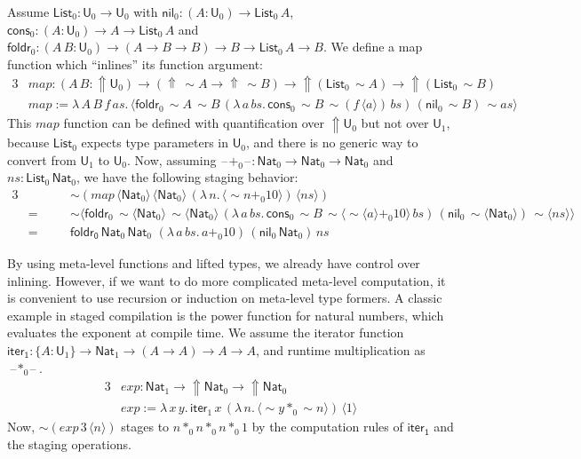 \documentclass[acmsmall]{acmart}
\newcommand{\mit}[1]{\mathit{#1}}
\newcommand{\msf}[1]{\mathsf{#1}}
\newcommand{\Lift}{{\Uparrow}}
\newcommand{\spl}{{\sim}}
\newcommand{\qut}[1]{\langle #1\rangle}
\renewcommand{\U}{\msf{U}}
\newcommand{\List}{\msf{List}}
\newcommand{\nil}{\msf{nil}}
\newcommand{\cons}{\msf{cons}}
\newcommand{\Nat}{\msf{Nat}}
\newcommand{\blank}{{\mathord{\hspace{1pt}\text{--}\hspace{1pt}}}}
\theoremstyle{remark}
\begin{document}
Assume $\List_0 : \U_0 \to \U_0$ with $\nil_0 : (A : \U_0) \to \List_0\,A$,
$\cons_0 : (A : \U_0) \to A \to \List_0\,A$ and $\msf{foldr}_0 : (A\,B : \U_0)
\to (A \to B \to B) \to B \to \List_0\,A \to B$. We define a map function which
``inlines'' its function argument:
\begin{alignat*}{3}
  & \mit{map} : (A\,B : \Lift\U_0) \to (\Lift\,\spl A \to \Lift\,\spl B)
      \to \Lift(\List_0\,\spl A) \to \Lift(\List_0\,\spl B)\\
  & \mit{map} := \lambda\,A\,B\,f\,\mit{as}.\,
      \qut{\msf{foldr}_0\,
        \spl A\,\spl B\,
        (\lambda\,a\,\mit{bs}.\, \cons_0\,\spl B\,\spl(f\,\qut{a})\,\mit{bs})\,
        (\nil_0\,\spl B)\,
        \spl as
        }
\end{alignat*}
This $\mit{map}$ function can be defined with quantification over $\Lift \U_0$ but not
over $\U_1$, because $\List_0$ expects type parameters in $\U_0$, and there is
no generic way to convert from $\U_1$ to $\U_0$. Now, assuming
$\blank\!+_0\!\blank : \Nat_0 \to \Nat_0 \to \Nat_0$ and $\mit{ns} :
\List_0\,\Nat_0$, we have the following staging behavior:
\begin{alignat*}{3}
  & &&\spl(\mit{map}\,\qut{\Nat_0}\,\qut{\Nat_0}\,(\lambda\,n.\,\qut{\spl n +_0 10})\,\qut{\mit{ns}})\\
  & =\hspace{1em}&&\spl\qut{\msf{foldr}_0\,
        \spl \qut{\Nat_0}\,\spl \qut{\Nat_0}\,
        (\lambda\,a\,\mit{bs}.\, \cons_0\,\spl B\,\spl\qut{\spl\qut{a} +_0 10}\,\mit{bs})\,
        (\nil_0\,\spl \qut{\Nat_0})\,
        \spl\qut{\mit{ns}}}\\
  & =\hspace{1em} &&\msf{foldr_0}\,\Nat_0\,\Nat_0\,\,(\lambda\,a\,bs.\,a +_0 10)\,(\nil_0\,\Nat_0)\,\mit{ns}
\end{alignat*}

By using meta-level functions and lifted types, we already have control over
inlining. However, if we want to do more complicated meta-level computation, it
is convenient to use recursion or induction on meta-level type formers. A
classic example in staged compilation is the power function for natural numbers,
which evaluates the exponent at compile time. We assume the iterator function
$\msf{iter_1} : \{A : \U_1\} \to \Nat_1 \to (A \to A) \to A \to A$, and runtime
multiplication as $\blank\!*_0\!\blank$.
\begin{alignat*}{3}
  &\mit{exp} : \Nat_1 \to \Lift \Nat_0 \to \Lift \Nat_0 \\
  &\mit{exp} := \lambda\,x\,y.\,
  \msf{iter}_1\,x\,(\lambda\,n.\,\qut{\spl y *_0 \spl n})\,\qut{1}
\end{alignat*}
Now, $\spl(\mit{exp}\,3\,\qut{n})$ stages to $n *_0 n *_0 n *_0 1$ by the computation rules
of $\msf{iter_1}$ and the staging operations.
\end{document}
